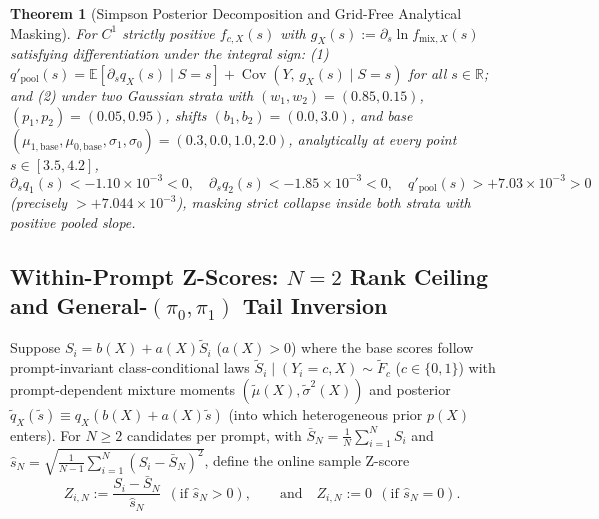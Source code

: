 \documentclass[10pt]{article}
\theoremstyle{plain}
\newtheorem{theorem}{Theorem}
\theoremstyle{definition}
\theoremstyle{remark}
\newcommand{\R}{\mathbb{R}}
\newcommand{\E}{\mathbb{E}}
\newcommand{\Cov}{\operatorname{Cov}}
\begin{document}
\begin{theorem}[Simpson Posterior Decomposition and Grid-Free Analytical Masking]
\label{thm:simpson}
For $C^1$ strictly positive $f_{c, X}(s)$ with $g_X(s) := \partial_s \ln f_{\mathrm{mix}, X}(s)$ satisfying differentiation under the integral sign: (1) $q'_{\mathrm{pool}}(s) = \E[\partial_s q_X(s) \mid S = s] + \Cov(Y,\, g_X(s) \mid S = s)$ for all $s \in \R$; and (2) under two Gaussian strata with $(w_1, w_2) = (0.85, 0.15)$, $(p_1, p_2) = (0.05, 0.95)$, shifts $(b_1, b_2) = (0.0, 3.0)$, and base $(\mu_{1,\mathrm{base}}, \mu_{0,\mathrm{base}}, \sigma_1, \sigma_0) = (0.3, 0.0, 1.0, 2.0)$, analytically at every point $s \in [3.5, 4.2]$,
\begin{equation}
\partial_s q_1(s) < -1.10\times 10^{-3} < 0, \quad \partial_s q_2(s) < -1.85\times 10^{-3} < 0, \quad q'_{\mathrm{pool}}(s) > +7.03\times 10^{-3} > 0
\end{equation}
(precisely $> +7.044\times 10^{-3}$), masking strict collapse inside both strata with positive pooled slope.
\end{theorem}

\subsection{Within-Prompt Z-Scores: \texorpdfstring{$N=2$}{N=2} Rank Ceiling and General-\texorpdfstring{$(\pi_0,\pi_1)$}{(pi0, pi1)} Tail Inversion}

Suppose $S_i = b(X) + a(X)\tilde{S}_i$ ($a(X) > 0$) where the base scores follow prompt-invariant class-conditional laws $\tilde{S}_i \mid (Y_i = c, X) \sim \tilde{F}_c$ ($c \in \{0, 1\}$) with prompt-dependent mixture moments $(\tilde{\mu}(X), \tilde{\sigma}^2(X))$ and posterior $\tilde{q}_X(\tilde{s}) \equiv q_X(b(X) + a(X)\tilde{s})$ (into which heterogeneous prior $p(X)$ enters). For $N \ge 2$ candidates per prompt, with $\bar{S}_N = \frac{1}{N}\sum_{i=1}^N S_i$ and $\hat{s}_N = \sqrt{\frac{1}{N-1}\sum_{i=1}^N(S_i - \bar{S}_N)^2}$, define the online sample Z-score
\begin{equation}
\label{eq:sample-z}
Z_{i, N} := \frac{S_i - \bar{S}_N}{\hat{s}_N} \ \ (\text{if }\hat{s}_N > 0), \qquad \text{and}\quad Z_{i,N} := 0 \ \ (\text{if }\hat{s}_N = 0).
\end{equation}
\end{document}

